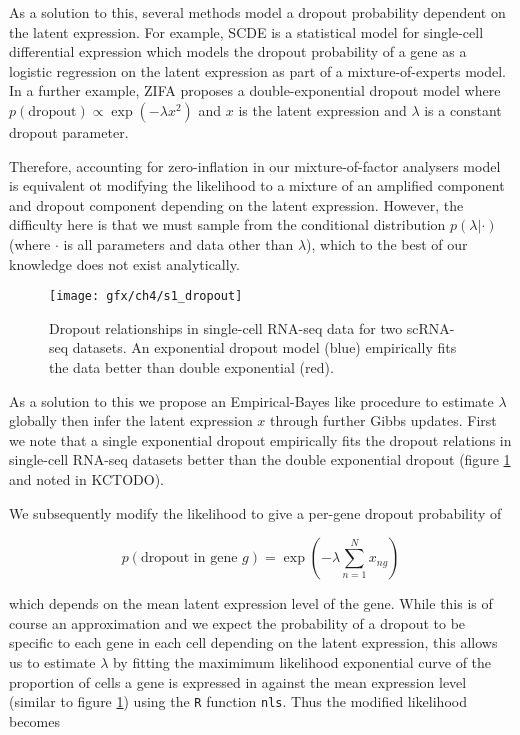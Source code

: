 As a solution to this, several methods model a dropout probability dependent on the latent expression. For example, SCDE \cite{kharchenko2014bayesian} is a statistical model for single-cell differential expression which models the dropout probability of a gene as a logistic regression on the latent expression as part of a mixture-of-experts model.
In a further example, ZIFA \cite{pierson2015zifa} proposes a double-exponential dropout model where $p(\text{dropout}) \propto \exp(-\lambda x^2)$ and $x$ is the latent expression and $\lambda$ is a constant dropout parameter.

Therefore, accounting for zero-inflation in our mixture-of-factor analysers model is equivalent ot modifying the likelihood to a mixture of an amplified component and dropout component depending on the latent expression. However, the difficulty here is that we must sample from the conditional distribution $p(\lambda | \cdot)$ (where $\cdot$ is all parameters and data other than $\lambda$), which to the best of our knowledge does not exist analytically.

\begin{figure}[h]
	\centering
	\texttt{[image: gfx/ch4/s1\_dropout]}
	\caption{Dropout relationships in single-cell RNA-seq data for two scRNA-seq datasets. An exponential dropout model (blue) empirically fits the data better than double exponential (red).} \label{fig:dropout}
\end{figure}

As a solution to this we propose an Empirical-Bayes like procedure to estimate $\lambda$ globally then infer the latent expression $x$ through further Gibbs updates. First we note that a single exponential dropout empirically fits the dropout relations in single-cell RNA-seq datasets better than the double exponential dropout (figure \ref{fig:dropout} and noted in KCTODO).

We subsequently modify the likelihood to give a per-gene dropout probability of

\begin{equation}
p(\text{dropout in gene $g$}) = \exp(-\lambda \sum_{n=1}^N x_{ng})
\end{equation}

 which depends on the mean latent expression level of the gene. While this is of course an approximation and we expect the probability of a dropout to be specific to each gene in each cell depending on the latent expression, this allows us to estimate $\lambda$ by fitting the maximimum likelihood exponential curve of the proportion of cells a gene is expressed in against the mean expression level (similar to figure \ref{fig:dropout}) using the \texttt{R} function \texttt{nls}. Thus the modified likelihood becomes

